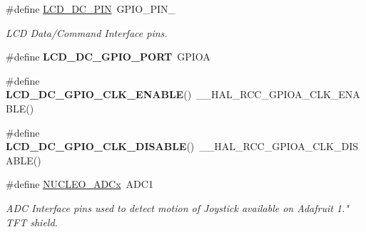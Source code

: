 \begin{DoxyCompactItemize}
\item 
\mbox{\label{group___s_t_m32_f0_x_x___n_u_c_l_e_o___b_u_s_ga402d8ccd0bb0a6cc377222e75b8e050e}} 
\#define \hyperlink{group___s_t_m32_f0_x_x___n_u_c_l_e_o___b_u_s_ga402d8ccd0bb0a6cc377222e75b8e050e}{L\+C\+D\+\_\+\+D\+C\+\_\+\+P\+IN}~G\+P\+I\+O\+\_\+\+P\+I\+N\+\_
\begin{DoxyCompactList}\small\item\em L\+CD Data/\+Command Interface pins. \end{DoxyCompactList}\item 
\mbox{\label{group___s_t_m32_f0_x_x___n_u_c_l_e_o___b_u_s_gab5a6486a69fe569816e674dfd75390d3}} 
\#define {\bfseries L\+C\+D\+\_\+\+D\+C\+\_\+\+G\+P\+I\+O\+\_\+\+P\+O\+RT}~G\+P\+I\+OA
\item 
\mbox{\label{group___s_t_m32_f0_x_x___n_u_c_l_e_o___b_u_s_gae0889041d2765c0df770f19cce4c2780}} 
\#define {\bfseries L\+C\+D\+\_\+\+D\+C\+\_\+\+G\+P\+I\+O\+\_\+\+C\+L\+K\+\_\+\+E\+N\+A\+B\+LE}()~\+\_\+\+\_\+\+H\+A\+L\+\_\+\+R\+C\+C\+\_\+\+G\+P\+I\+O\+A\+\_\+\+C\+L\+K\+\_\+\+E\+N\+A\+B\+LE()
\item 
\mbox{\label{group___s_t_m32_f0_x_x___n_u_c_l_e_o___b_u_s_gac0a9221630f2546fdc4519a37597d746}} 
\#define {\bfseries L\+C\+D\+\_\+\+D\+C\+\_\+\+G\+P\+I\+O\+\_\+\+C\+L\+K\+\_\+\+D\+I\+S\+A\+B\+LE}()~\+\_\+\+\_\+\+H\+A\+L\+\_\+\+R\+C\+C\+\_\+\+G\+P\+I\+O\+A\+\_\+\+C\+L\+K\+\_\+\+D\+I\+S\+A\+B\+LE()
\item 
\mbox{\label{group___s_t_m32_f0_x_x___n_u_c_l_e_o___b_u_s_ga3ee6ef6d95ffdf4a62a17cc50e18851e}} 
\#define \hyperlink{group___s_t_m32_f0_x_x___n_u_c_l_e_o___b_u_s_ga3ee6ef6d95ffdf4a62a17cc50e18851e}{N\+U\+C\+L\+E\+O\+\_\+\+A\+D\+Cx}~A\+D\+C1
\begin{DoxyCompactList}\small\item\em A\+DC Interface pins used to detect motion of Joystick available on Adafruit 1." T\+FT shield. \end{DoxyCompactList}\item 
\mbox{\label{group___s_t_m32_f0_x_x___n_u_c_l_e_o___b_u_s_ga8a204e807e9d3553f0b2992029d3d660}} 

\end{DoxyCompactItemize}
